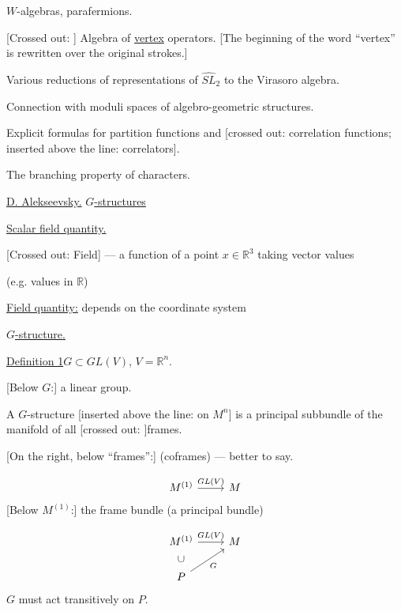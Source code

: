 $W$-algebras, parafermions.

[Crossed out: ]
Algebra of \underline{vertex} operators.
[The beginning of the word ``vertex'' is rewritten over the original strokes.]

Various reductions of representations of $\widehat{SL}_2$ to the Virasoro algebra.

Connection with moduli spaces of algebro-geometric structures.

Explicit formulas for partition functions and
[crossed out: correlation functions; inserted above the line: correlators].

The branching property of characters.

\underline{D. Alekseevsky.} \qquad \underline{$G$-structures}

\underline{Scalar field quantity.}

[Crossed out: Field] --- a function of a point $x\in\mathbb{R}^3$ taking vector values

(e.g. values in $\mathbb{R}$)

\underline{Field quantity:} depends on the coordinate system

\underline{$G$-structure.}

\underline{Definition 1}\quad $G\subset GL(V)$, $V=\mathbb{R}^n$.

[Below $G$:] a linear group.

A $G$-structure [inserted above the line: on $M^n$] is a principal subbundle of the manifold of all
[crossed out: ]frames.

[On the right, below ``frames'':] (coframes) --- better to say.

\begin{equation*}
\begin{tikzcd}
M^{(1)} \arrow[r,"GL(V)"] & M
\end{tikzcd}
\end{equation*}
[Below $M^{(1)}$:] the frame bundle (a principal bundle)

\begin{equation*}
\begin{tikzcd}
M^{(1)} \arrow[r,"GL(V)"] & M \\
P \arrow[u,phantom,"\cup" description] \arrow[ur,"G"'] &
\end{tikzcd}
\end{equation*}
$G$ must act transitively on $P$.

